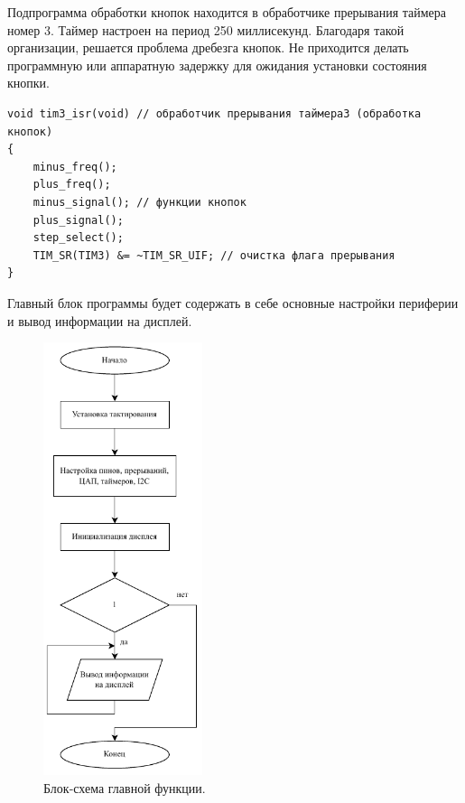 	Подпрограмма обработки кнопок находится в обработчике прерывания таймера номер 3. Таймер настроен на период 250 миллисекунд. Благодаря такой организации, решается проблема дребезга кнопок. Не приходится делать программную или аппаратную задержку для ожидания установки состояния кнопки.

\begin{code}
\begin{verbatim}
void tim3_isr(void) // обработчик прерывания таймера3 (обработка кнопок)
{
    minus_freq();
    plus_freq();
    minus_signal(); // функции кнопок
    plus_signal();
    step_select();
    TIM_SR(TIM3) &= ~TIM_SR_UIF; // очистка флага прерывания
}
\end{verbatim}
\end{code}
	
	Главный блок программы будет содержать в себе основные настройки периферии и вывод информации на дисплей.
	\begin{figure}[H]
    \centering
    \includegraphics[width=0.415\textwidth]{../image/main.pdf}
    \caption{Блок-схема главной функции.}
	\end{figure}
	

